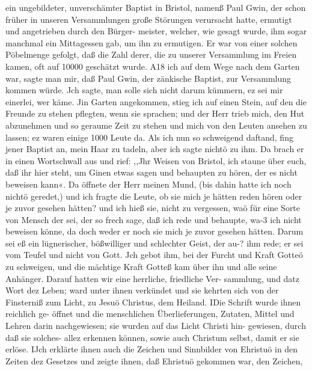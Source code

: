 ein ungebildeter, unverschämter Baptist in Bristol, namenß Paul
Gwin, der schon früher in unseren Versammlungen große Störungen
verursacht hatte, ermutigt und angetrieben durch den Bürger-
meister, welcher, wie gesagt wurde, ihm sogar manchmal ein
Mittagessen gab, um ihn zu ermutigen. Er war von einer
solchen Pöbelmenge gefolgt, daß die Zahl derer, die zu unserer
Versammlung im Freien kamen, oft auf 10000 geschätzt wurde.
A18 ich auf dem Wege nach dem Garten war, sagte man mir,
daß Paul Gwin, der zänkische Baptist, zur Versammlung kommen
würde. Jch sagte, man solle sich nicht darum kümmern, ez sei
mir einerlei, wer käme. Jin Garten angekommen, stieg ich auf
einen Stein, auf den die Freunde zu stehen pflegten, wenn sie
sprachen; und der Herr trieb mich, den Hut abzunehmen und so
geraume Zeit zu stehen und mich von den Leuten ansehen zu
lassen; ez waren einige 1000 Leute da. Als ich nun so schweigend
daftand, fing jener Baptist an, mein Haar zu tadeln, aber ich
sagte nichtö zu ihm. Da brach er in einen Wortschwall aus und
rief: ,,Jhr Weisen von Bristol, ich staune über euch, daß ihr hier
steht, um Ginen etwas sagen und behaupten zu hören, der es
nicht beweisen kann«. Da öffnete der Herr meinen Mund, (bis
dahin hatte ich noch nichtö geredet,) und ich fragte die Leute, ob
sie mich je hätten reden hören oder je zuvor gesehen hätten? und
ich hieß sie, nicht zu vergessen, waö für eine Sorte von Mensch
der sei, der so frech sage, daß ich rede und behaupte, wa-3 ich
nicht beweisen könne, da doch weder er noch sie mich je zuvor
gesehen hätten. Darum sei eß ein lügnerischer, bößwilliger und
schlechter Geist, der au-? ihm rede; er sei vom Teufel und nicht
von Gott. Jch gebot ihm, bei der Furcht und Kraft Gotteö zu
schweigen, und die mächtige Kraft Gotteß kam über ihn und alle
seine Anhänger. Darauf hatten wir eine herrliche, friedliche Ver-
sammlung, und datz Wort dez Leben; ward unter ihnen verkündet
und sie kehrten sich von der Finsterniß zum Licht, zu Jesuö
Christus, dem Heiland. IDie Schrift wurde ihnen reichlich ge-
öffnet und die menschlichen Überlieferungen, Zutaten, Mittel und
Lehren darin nachgewiesen; sie wurden auf das Licht Christi hin-
gewiesen, durch daß sie solches- allez erkennen können, sowie auch
Christum selbst, damit er sie erlöse. IJch erklärte ihnen auch die
Zeichen und Sinnbilder von Ehristuö in den Zeiten dez Gesetzes
und zeigte ihnen, daß Ehristuö gekommen war, den Zeichen,


